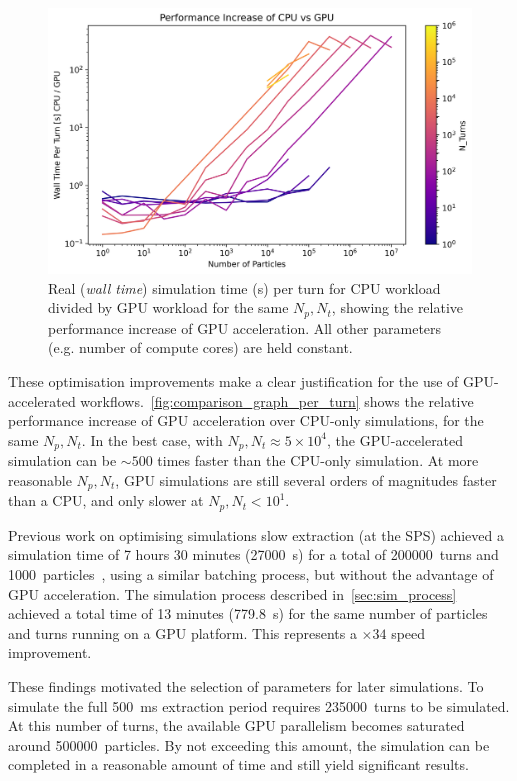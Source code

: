 \documentclass[a4paper,twoside,11pt]{report}
\begin{document}
\begin{figure}
  \centering
  \includegraphics*[width=0.77\linewidth]{COMPARISON_graph_per_turn.png}
  \cprotect\caption[Comparison of simulation time performance between CPU and GPU workloads]{Real (\textit{wall time}) simulation time (s) per turn for CPU workload divided by GPU workload for the same $N_p, N_t$, showing the relative performance increase of GPU acceleration. All other parameters (e.g. number of compute cores) are held constant.}\label{fig:comparison_graph_per_turn}
\end{figure}

These optimisation improvements make a clear justification for the use of GPU-accelerated workflows.~\autoref{fig:comparison_graph_per_turn} shows the relative performance increase of GPU acceleration over CPU-only simulations, for the same $N_p, N_t$. In the best case, with $N_p, N_t \approx 5\times 10^4$, the GPU-accelerated simulation can be $\sim 500$ times faster than the CPU-only simulation. At more reasonable $N_p, N_t$, GPU simulations are still several orders of magnitudes faster than a CPU, and only slower at $N_p, N_t < 10^1$.

Previous work on optimising simulations slow extraction (at the SPS) achieved a simulation time of 7 hours 30 minutes (\qty{27000}{\second}) for a total of \qty{200000}{turns} and \qty{1000}{particles}~\cite[Figure 3]{Schicho:2039579}, using a similar batching process, but without the advantage of GPU acceleration. The simulation process described in~\autoref{sec:sim_process} achieved a total time of 13 minutes (\qty{779.8}{\second}) for the same number of particles and turns running on a GPU platform. This represents a $\times 34$ speed improvement.

These findings motivated the selection of parameters for later simulations. To simulate the full \qty{500}{\milli\second} extraction period requires \qty{235000}{turns} to be simulated. At this number of turns, the available GPU parallelism becomes saturated around \qty{500000}{particles}. By not exceeding this amount, the simulation can be completed in a reasonable amount of time and still yield significant results.
\end{document}

